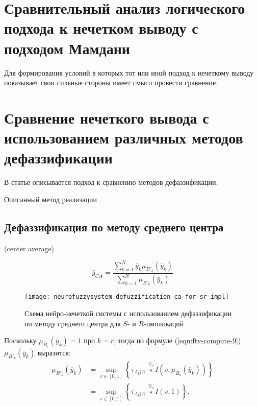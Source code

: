 \section{Сравнительный анализ логического подхода к нечетком выводу с подходом Мамдани}

Для формирования условий  в которых тот или иной подход к нечеткому выводу показывает  свои сильные стороны имеет смысл провести сравнение.

\section{Сравнение нечеткого вывода с использованием различных методов дефаззификации}

В статье \cite{VanLeekwijck1999} описывается подход к сравнению методов дефаззификации.

Описанный метод реализации \cite{eisele1994}.

\subsection{Дефаззификация по методу среднего центра}

(center average)

\begin{equation*}
	\label{eqn:defuz-ca-1}
	\hat{y}_{CA} = \frac{\sum_{k=1}^{N} \bar{y}_k \mu_{B'_k}(\bar{y}_k)}{\sum_{k=1}^{N} \mu_{B'_k}(\bar{y}_k)}
\end{equation*}

\begin{figure}[ht]
	\centering
	\texttt{[image: neurofuzzysystem-defuzzification-ca-for-sr-impl]}
	\caption{Схема нейро-нечеткой системы с использованием дефаззификации по методу среднего центра для $S$- и $R$-импликаций}
	\label{fig:neurofuzzysystem-defuzzification-ca-for-sr-impl}
\end{figure}

Поскольку $\mu_{B_r}(\overline{y}_k) = 1$ при $k = r$, тогда по формуле (\ref{eqn:ftv-compute-9}) $\mu_{B'_k}(\overline{y}_k)$ выразится:
\begin{align}
	\label{eqn:defuz-ca-3}
	\mu_{B'_k}(\overline{y}_k) &= \sup_{v\in [0, 1]} \left\{\tau_{A_k|A'}\overset{\mathrm{T}_2}{\star} I\left(v, \mu_{B_k}(\overline{y}_k)\right)\right\}\\ &= \sup_{v\in [0, 1]} \left\{\tau_{A_k|A'}\overset{\mathrm{T}_2}{\star} I\left(v, 1\right)\right\}.
\end{align}


